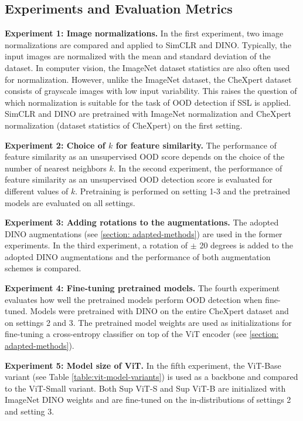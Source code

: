 \subsection{Experiments and Evaluation Metrics}
\label{section: experiments}
\textbf{Experiment 1: Image normalizations.} In the first experiment, two image normalizations are compared and applied to SimCLR and DINO.
Typically, the input images are normalized with the mean and standard deviation of the dataset.
In computer vision, the ImageNet dataset statistics \citep{Deng2009} are also often used for normalization.
However, unlike the ImageNet dataset, the CheXpert dataset consists of grayscale images with low input variability.
This raises the question of which normalization is suitable for the task of OOD detection if SSL is applied.
SimCLR and DINO are pretrained with ImageNet normalization and CheXpert normalization (dataset statistics of CheXpert) on the first setting.
\par
\textbf{Experiment 2: Choice of $k$ for feature similarity.} The performance of feature similarity as an unsupervised OOD score depends on the choice of the number of nearest neighbors $k$.
In the second experiment, the performance of feature similarity as an unsupervised OOD detection score is evaluated for different values of $k$.
Pretraining is performed on setting 1-3 and the pretrained models are evaluated on all settings.
\par
\textbf{Experiment 3: Adding rotations to the augmentations.}
The adopted DINO augmentations (see \ref{section: adapted-methods}) are used in the former experiments.
In the third experiment, a rotation of $\pm$ 20 degrees is added to the adopted DINO augmentations and the performance of both augmentation schemes is compared.
\par
\textbf{Experiment 4: Fine-tuning pretrained models.}
The fourth experiment evaluates how well the pretrained models perform OOD detection when fine-tuned.
Models were pretrained with DINO on the entire CheXpert dataset and on settings 2 and 3.
The pretrained model weights are used as initializations for fine-tuning a cross-entropy classifier on top of the ViT encoder (see \ref{section: adapted-methods}).
\par
\textbf{Experiment 5: Model size of ViT.}
In the fifth experiment, the ViT-Base variant (see Table \ref{table:vit-model-variants}) is used as a backbone and compared to the ViT-Small variant.
Both Sup ViT-S and Sup ViT-B are initialized with ImageNet DINO weights and are fine-tuned on the in-distributions of settings 2 and setting 3.
